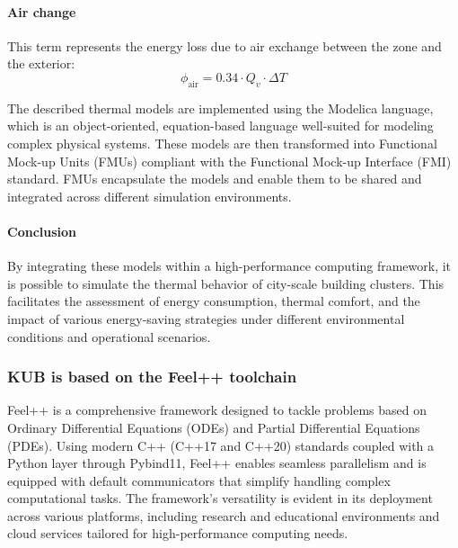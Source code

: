 \documentclass[runningheads]{llncs}
\begin{document}
\paragraph{Air change} This term represents the energy loss due to air exchange between the zone and the exterior:
\begin{equation}
  \phi_{\mathrm{air}} = 0.34 \cdot Q_v \cdot \Delta T
\end{equation}

The described thermal models are implemented using the Modelica language, which is an object-oriented, equation-based language well-suited for modeling complex physical systems. 
These models are then transformed into Functional Mock-up Units (FMUs) compliant with the Functional Mock-up Interface (FMI) standard. 
FMUs encapsulate the models and enable them to be shared and integrated across different simulation environments.


\paragraph{Conclusion}

By integrating these models within a high-performance computing framework, it is possible to simulate the thermal behavior of city-scale building clusters. This facilitates the assessment of energy consumption, thermal comfort, and the impact of various energy-saving strategies under different environmental conditions and operational scenarios.

\subsubsection{KUB is based on the Feel++ toolchain}

Feel++ is a comprehensive framework designed to tackle problems based on Ordinary Differential Equations (ODEs) and Partial Differential Equations (PDEs). 
Using modern C++ (C++17 and C++20) standards coupled with a Python layer through Pybind11, Feel++ enables seamless parallelism and is equipped with default communicators that simplify handling complex computational tasks.
The framework's versatility is evident in its deployment across various platforms, including research and educational environments and cloud services tailored for high-performance computing needs.
\end{document}

